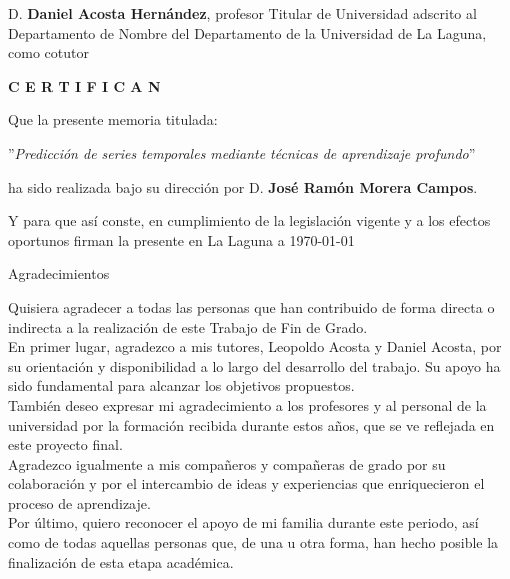 \documentclass[spanish,a4paper,12pt,oneside]{extreport}
\begin{document}
\bigskip
D. {\bf Daniel Acosta Hernández}, profesor Titular de Universidad adscrito al Departamento de Nombre del Departamento de la Universidad de La Laguna, como cotutor\pagestyle{empty}

\bigskip
\bigskip
{\bf C E R T I F I C A N}

\bigskip
\bigskip
Que la presente memoria titulada:

\bigskip
''{\it Predicción de series temporales mediante técnicas de aprendizaje profundo}''

\bigskip
\bigskip
\bigskip

\noindent ha sido realizada bajo su dirección por D. {\bf José Ramón Morera Campos}.

\bigskip
\bigskip

Y para que así conste, en cumplimiento de la legislación vigente y a los efectos
oportunos firman la presente en La Laguna a \today

\newpage
\thispagestyle{empty}

{ \begin{LARGE}
Agradecimientos
\end{LARGE}

\hspace{3mm}

\begin{large}
Quisiera agradecer a todas las personas que han contribuido de forma directa o indirecta a la realización de este Trabajo de Fin de Grado. \\

En primer lugar, agradezco a mis tutores, Leopoldo Acosta y Daniel Acosta, por su orientación y disponibilidad a lo largo del desarrollo del trabajo. 
Su apoyo ha sido fundamental para alcanzar los objetivos propuestos. \\

También deseo expresar mi agradecimiento a los profesores y al personal de la universidad por la formación recibida durante estos años, que se ve reflejada en este proyecto final. \\

Agradezco igualmente a mis compañeros y compañeras de grado por su colaboración y por el intercambio de ideas y experiencias que enriquecieron el proceso de aprendizaje. \\

Por último, quiero reconocer el apoyo de mi familia durante este periodo, así como de todas aquellas personas que, de una u otra forma, han hecho posible la finalización de esta etapa académica. \\
\end{large}

}
\newpage
\thispagestyle{empty}
\end{document}
